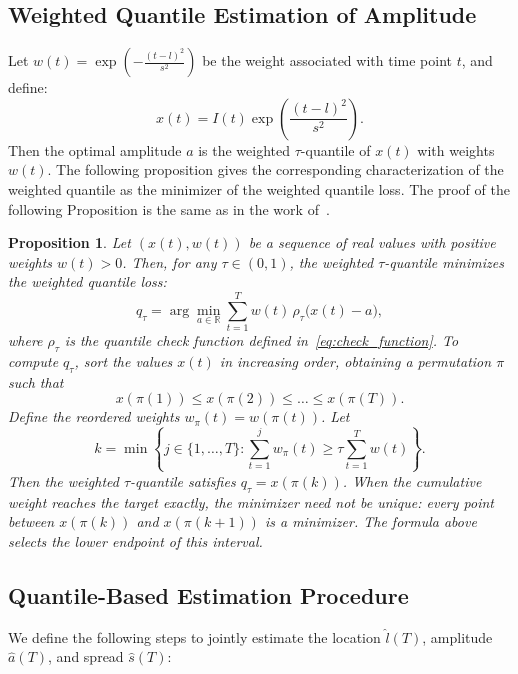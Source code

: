 \documentclass[12pt,a4paper]{article}
\newtheorem{proposition}{Proposition}
\begin{document}
\subsection{Weighted Quantile Estimation of Amplitude}
\label{sec:weighted_median_method}

Let \( w(t) = \exp\left( -\frac{(t - l)^2}{s^2} \right) \) be the weight associated with time point \( t \), and define:
\[
x(t) = I(t) \exp\left( \frac{(t - l)^2}{s^2} \right).
\]
Then the optimal amplitude $a$ is the weighted $\tau$-quantile of
$x(t)$ with weights $w(t)$. The following proposition gives the
corresponding characterization of the weighted quantile as the minimizer
of the weighted quantile loss.
The proof of the following Proposition is the same as in the work of~\citet{Nov20}.
\begin{proposition}
\label{prop:weighted:quantile}
Let \( (x(t), w(t)) \) be a sequence of real values with positive weights \( w(t) > 0 \). Then, for any \( \tau \in (0,1) \), the weighted \( \tau \)-quantile minimizes the weighted quantile loss:
\[
q_\tau = \arg\min_{a \in \mathbb{R}} \sum_{t=1}^T w(t)\,\rho_\tau\bigl(x(t) - a\bigr),
\]
where $\rho_\tau$ is the quantile check function defined in~\eqref{eq:check_function}.
To compute \( q_\tau \), sort the values \( x(t) \) in increasing order, obtaining a permutation \( \pi \) such that
\[
x(\pi(1)) \leq x(\pi(2)) \leq \dots \leq x(\pi(T)).
\]
Define the reordered weights \( w_\pi(t) = w(\pi(t)) \). Let
\[
k = \min \left\{ j \in \{1, \dots, T\} : \sum_{t=1}^j w_\pi(t) \geq \tau \sum_{t=1}^T w(t) \right\}.
\]
Then the weighted \( \tau \)-quantile satisfies \( q_\tau = x(\pi(k)) \).
When the cumulative weight reaches the target exactly, the minimizer need not be unique: every point between \(x(\pi(k))\) and \(x(\pi(k+1))\) is a minimizer. The formula above selects the lower endpoint of this interval.
\end{proposition}


\subsection{Quantile-Based Estimation Procedure}

We define the following steps to jointly estimate the location \( \hat{l}(T) \), amplitude \( \hat{a}(T) \), and spread \( \hat{s}(T) \):
\end{document}
